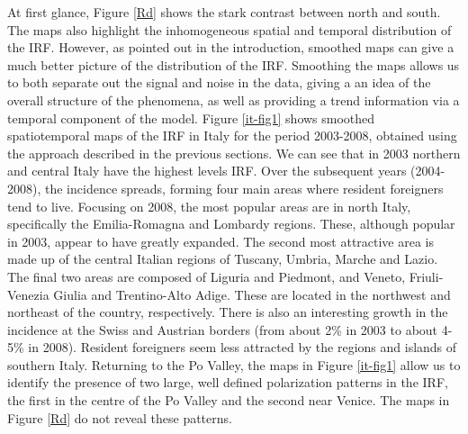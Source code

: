 At first glance, Figure \ref{Rd} shows the stark contrast between north and south. The maps also highlight the inhomogeneous spatial and temporal distribution of the IRF. However, as pointed out in the introduction, smoothed maps can give a much better picture of the distribution of the IRF. Smoothing the maps allows us to both separate out the signal and noise in the data, giving a an idea of the overall structure of the phenomena, as well as providing a trend information via a temporal component of the model. Figure \ref{it-fig1} shows smoothed spatiotemporal maps of the IRF in Italy for the period 2003-2008, obtained using the approach described in the previous sections. We can see that in 2003 northern and central Italy have the highest levels IRF. Over the subsequent years (2004-2008), the incidence spreads, forming four main areas where resident foreigners tend to live. Focusing on 2008, the most popular areas are in north Italy, specifically the Emilia-Romagna and Lombardy regions. These, although popular in 2003, appear to have greatly expanded. The second most attractive area is made up of the central Italian regions of Tuscany, Umbria, Marche and Lazio. The final two areas are composed of Liguria and Piedmont, and Veneto, Friuli-Venezia Giulia and Trentino-Alto Adige. These are located in the northwest and northeast of the country, respectively. There is also an interesting growth in the incidence at the Swiss and Austrian borders (from about 2\% in 2003 to about 4-5\% in 2008). Resident foreigners seem less attracted by the regions and islands of southern Italy. Returning to the Po Valley, the maps in Figure \ref{it-fig1} allow us to identify the presence of two large, well defined polarization patterns in the IRF, the first in the centre of the Po Valley and the second near Venice. The maps in Figure \ref{Rd} do not reveal these patterns.


